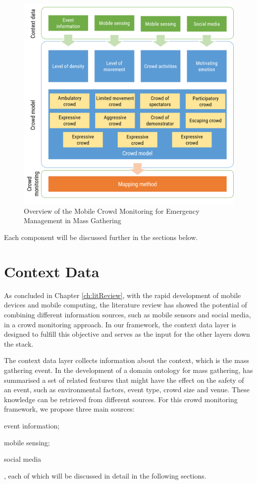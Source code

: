\begin{figure}[htbp!] 
	\centering    
	\includegraphics[width=1.0\textwidth]{FrameworkOverview}
	\caption{Overview of the Mobile Crowd Monitoring for Emergency Management in Mass Gathering}
	\label{fig:frameworkOverview}
\end{figure}

Each component will be discussed further in the sections below.

\section{Context Data}

As concluded in Chapter \ref{ch:litReview}, with the rapid development of mobile devices and mobile computing, the literature review has showed the potential of combining different information sources, such as mobile sensors and social media, in a crowd monitoring approach. In our framework, the context data layer is designed to fulfill this objective and serves as the input for the other layers down the stack.

The context data layer collects information about the context, which is the mass gathering event. In the development of a domain ontology for mass gathering, \citet{DelirHaghighi2013a} has summarised a set of related features that might have the effect on the safety of an event, such as environmental factors, event type, crowd size and venue. These knowledge can be retrieved from different sources. For this crowd monitoring framework, we propose three main sources: 
\begin{inparaenum}[i)]
	\item event information;
	\item mobile sensing;
	\item social media
\end{inparaenum}, each of which will be discussed in detail in the following sections.

